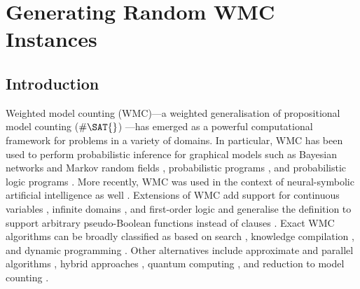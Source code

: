 \chapter{Generating Random WMC Instances} \label{chapter:comparison}

\section{Introduction}

Weighted model counting (\textsf{WMC})---a weighted generalisation of
propositional model counting
($\#\SAT{}$) \citep{DBLP:journals/ai/ChaviraD08}---has emerged as a powerful
computational framework for problems in a variety of domains. In particular,
\textsf{WMC} has been used to perform probabilistic inference for graphical
models such as Bayesian networks and Markov random
fields \citep{DBLP:conf/ecai/BartKLM16,DBLP:conf/ijcai/ChaviraD05,DBLP:conf/sat/ChaviraD06,DBLP:conf/kr/Darwiche02,DBLP:conf/aaai/SangBK05},
probabilistic programs \citep{DBLP:journals/pacmpl/HoltzenBM20}, and
probabilistic logic programs \citep{DBLP:journals/tplp/FierensBRSGTJR15}. More
recently, \textsf{WMC} was used in the context of neural-symbolic artificial
intelligence as well \citep{DBLP:conf/icml/XuZFLB18}. Extensions of \textsf{WMC}
add support for continuous variables \citep{DBLP:conf/ijcai/BellePB15}, infinite
domains \citep{DBLP:conf/aaai/Belle17}, and first-order
logic \citep{DBLP:conf/ijcai/BroeckTMDR11,DBLP:journals/cacm/GogateD16} and
generalise the definition to support arbitrary pseudo-Boolean functions instead
of clauses \citep{DBLP:conf/sat/DilkasB21}.
Exact \textsf{WMC} algorithms can be broadly classified as based on
search \citep{DBLP:conf/sat/SangBBKP04,DBLP:conf/ijcai/SharmaRSM19}, knowledge
compilation \citep{DBLP:conf/ecai/Darwiche04,DBLP:conf/ijcai/LagniezM17,DBLP:conf/ijcai/OztokD15}, and
dynamic programming \citep{DBLP:conf/aaai/DudekPV20,DBLP:conf/cp/DudekPV20}. Other alternatives include approximate \citep{DBLP:conf/aaai/RenkensKBR14} and parallel algorithms \citep{DBLP:conf/pgm/DalLL18,DBLP:conf/esa/FichteHWZ18}, hybrid approaches \citep{DBLP:conf/sat/HecherTW20}, quantum computing \citep{DBLP:conf/ecai/Riguzzi20}, and reduction to model counting \citep{DBLP:conf/ijcai/ChakrabortyFMV15}.

